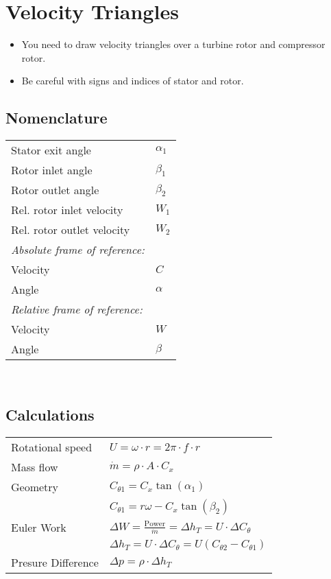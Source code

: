 




\section*{Velocity Triangles}
\begin{itemize}
	\item You need to draw velocity triangles over a turbine rotor and compressor rotor.
	\item Be careful with signs and indices of stator and rotor.
\end{itemize}

\subsection*{Nomenclature}
\begin{tabular}{ m{5cm} l}
	Stator exit angle & $\alpha_1$\\
	Rotor inlet angle & $\beta_1$ \\
	Rotor outlet angle & $\beta_2$ \\
	Rel. rotor inlet velocity & $W_1$ \\
	Rel. rotor outlet velocity & $W_2$ \\
   \textit{ Absolute frame of reference:} & \\
    Velocity & $C$ \\
    Angle & $\alpha$ \\
    \textit{Relative frame of reference:} & \\
    Velocity & $W$ \\
    Angle & $\beta$ \\
\end{tabular} \\

\subsection*{Calculations}
\begin{tabular}{ m{5cm} l}
	Rotational speed & $U = \omega \cdot r = 2 \pi \cdot f \cdot r$ \\
	Mass flow & $\dot{m} = \rho \cdot A \cdot C_x $ \\
	Geometry & $C_{\theta 1 } = C_x \tan( \alpha_1 ) $ \\
		& $C_{\theta 1} = r \omega - C_x \tan \left( \beta_2 \right) $ \\
	Euler Work & $\Delta W = \frac{\text{Power}}{\dot{m}} = \Delta h_T = U \cdot \Delta C_\theta$ \\
	& $\Delta h_T = U \cdot \Delta C_\theta = U \left(C_{\theta 2} - C _{\theta 1} \right) $ \\
	Presure Difference & $\Delta p = \rho \cdot \Delta h_T$
\end{tabular}

